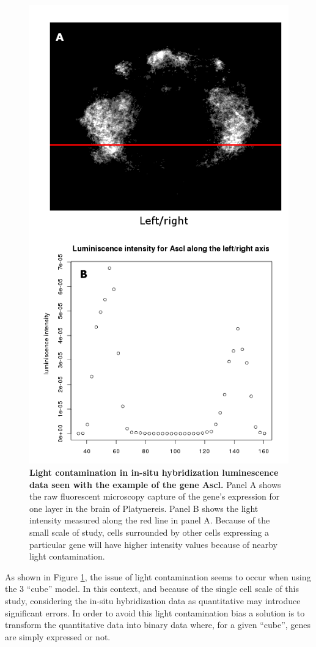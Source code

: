    \begin{figure}[H]
\centerline{\includegraphics[width=0.8\linewidth]{gfx/chapter2/whybina.png}}
\caption{{\bf Light contamination in in-situ hybridization luminescence data seen with the example of the gene Ascl.} Panel A shows the raw fluorescent microscopy capture of the gene's expression for one layer in the brain of Platynereis. Panel B shows the light intensity measured along the red line in panel A. Because of the small scale of study, cells surrounded by other cells expressing a particular gene will have higher intensity values because of nearby light contamination.}\label{fig:why_binarize}
	\end{figure}
  
  As shown in Figure \ref{fig:why_binarize}, the issue of light contamination seems to occur when using the 3  ``cube'' model. In this context, and because of the single cell scale of this study, considering the in-situ hybridization data as quantitative may introduce significant errors. In order to avoid this light contamination bias a solution is to transform the quantitative data into binary data where, for a given ``cube'', genes are simply expressed or not.
  



